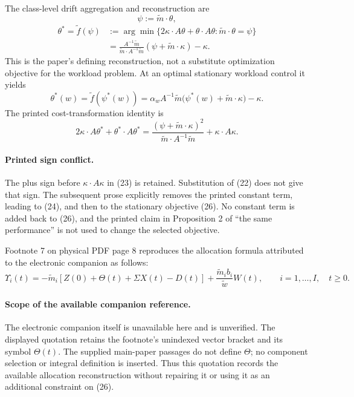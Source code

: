 \documentclass[11pt]{article}
\begin{document}
The class-level drift aggregation and reconstruction are
\[
\psi:=\tilde m\cdot\theta,
\]
\begin{equation}
\begin{aligned}
\theta^*=\tilde f(\psi)
&:=\arg\min\{2\kappa\cdot A\theta+\theta\cdot A\theta:
                 \tilde m\cdot\theta=\psi\}\\
&=\frac{A^{-1}\tilde m}{\tilde m\cdot A^{-1}\tilde m}
(\psi+\tilde m\cdot\kappa)-\kappa.
\end{aligned}
\tag{22}
\end{equation}
This is the paper's defining reconstruction, not a substitute optimization objective for the workload problem. At an optimal stationary workload control it yields
\begin{equation}
\theta^*(w)=\tilde f(\psi^*(w))
=\alpha_w A^{-1}\tilde m\bigl(\psi^*(w)+\tilde m\cdot\kappa\bigr)-\kappa.
\tag{30}
\end{equation}
The printed cost-transformation identity is
\begin{equation}
2\kappa\cdot A\theta^*+\theta^*\cdot A\theta^*
=\frac{(\psi+\tilde m\cdot\kappa)^2}{\tilde m\cdot A^{-1}\tilde m}
+\kappa\cdot A\kappa.
\tag{23}
\end{equation}
\paragraph{Printed sign conflict.}
The plus sign before \(\kappa\cdot A\kappa\) in (23) is retained. Substitution of (22) does not give that sign. The subsequent prose explicitly removes the printed constant term, leading to (24), and then to the stationary objective (26). No constant term is added back to (26), and the printed claim in Proposition 2 of ``the same performance'' is not used to change the selected objective.

Footnote 7 on physical PDF page 8 reproduces the allocation formula attributed to the electronic companion as follows:
\begin{equation}
\Upsilon_i(t)=-\tilde m_i[Z(0)+\Theta(t)+\Sigma X(t)-D(t)]
+\frac{\tilde m_i b_i}{\tilde w}W(t),
\qquad i=1,\ldots,I,\quad t\geq0.
\tag{EC.1, as quoted}
\end{equation}
\paragraph{Scope of the available companion reference.}
The electronic companion itself is unavailable here and is unverified. The displayed quotation retains the footnote's unindexed vector bracket and its symbol \(\Theta(t)\). The supplied main-paper passages do not define \(\Theta\); no component selection or integral definition is inserted. Thus this quotation records the available allocation reconstruction without repairing it or using it as an additional constraint on (26).
\end{document}
